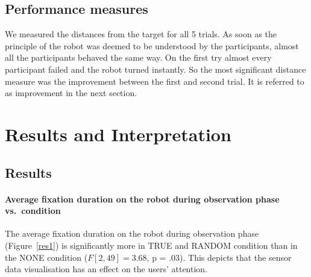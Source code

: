 \documentclass{sig-alternate}
\begin{document}
\subsection{Performance measures}


We measured the distances from the target for all 5 trials. As soon as the principle of the robot was deemed to be understood by the participants, almost all the participants behaved the same way. On the first try almost every participant failed and the robot turned instantly. So the most significant distance measure was the
improvement between the first and second trial. It is referred to as improvement in the next section.




\section{Results and Interpretation}
\label{interpretation}



\subsection{Results}


\paragraph{Average fixation duration on the robot during observation phase
vs.~condition}

The average fixation duration on the robot during observation phase
(Figure~\ref{res1}) is significantly more in {\sf TRUE} and {\sf RANDOM} condition than in
the {\sf NONE} condition ($F[2,49]=3.68$, p = .03). This depicts that the
sensor data visualisation has an effect on the users' attention.
\end{document}
